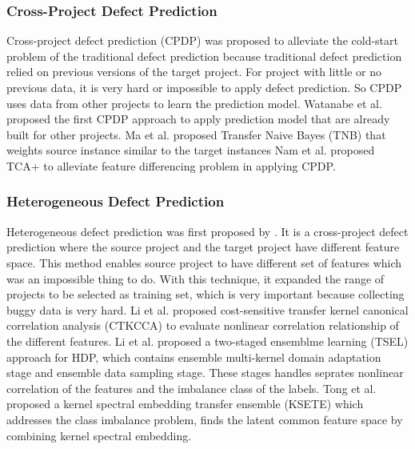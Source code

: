 \subsubsection{Cross-Project Defect Prediction}
Cross-project defect prediction (CPDP) was proposed to alleviate the cold-start problem of the traditional defect prediction because traditional defect prediction relied on previous versions of the target project.
For project with little or no previous data, it is very hard or impossible to apply defect prediction.
So CPDP uses data from other projects to learn the prediction model.
Watanabe et al. \cite{watanabe2008adapting} proposed the first CPDP approach to apply prediction model that are already built for other projects.
Ma et al. \cite{ma2012transfer} proposed Transfer Naive Bayes (TNB) that weights source instance similar to the target instances
Nam et al. \cite{nam2013transfer} proposed TCA+ to alleviate feature differencing problem in applying CPDP.

\subsubsection{Heterogeneous Defect Prediction}
Heterogeneous defect prediction was first proposed by \cite{nam2017heterogeneous}. It is a cross-project defect prediction where the source project and the target project have different feature space.
This method enables source project to have different set of features which was an impossible thing to do.
With this technique, it expanded the range of projects to be selected as training set, which is very important because collecting buggy data is very hard.
Li et al. \cite{li2018cost} proposed cost-sensitive transfer kernel canonical correlation analysis (CTKCCA) to evaluate nonlinear correlation relationship of the different features.
Li et al. \cite{li2019heterogeneous} proposed a two-staged ensemblme learning (TSEL) approach for HDP, which contains ensemble multi-kernel domain adaptation stage and ensemble data sampling stage. These stages handles seprates nonlinear correlation of the features and the imbalance class of the labels.
Tong et al. \cite{tong2019kernel} proposed a kernel spectral embedding transfer ensemble (KSETE) which addresses the class imbalance problem, finds the latent common feature space by combining kernel spectral embedding.

